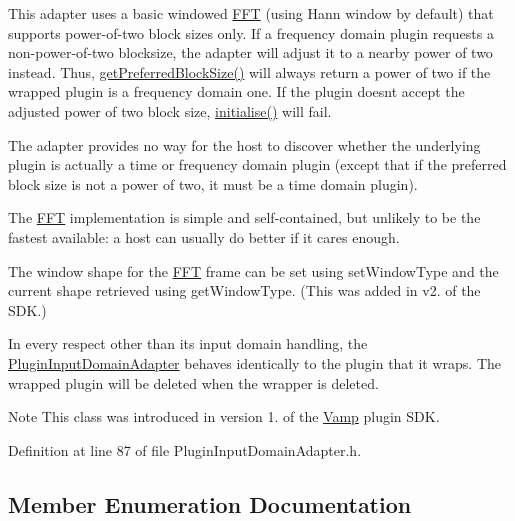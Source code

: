 This adapter uses a basic windowed \hyperlink{class_vamp_1_1_f_f_t}{F\+FT} (using Hann window by default) that supports power-\/of-\/two block sizes only. If a frequency domain plugin requests a non-\/power-\/of-\/two blocksize, the adapter will adjust it to a nearby power of two instead. Thus, \hyperlink{class_vamp_1_1_host_ext_1_1_plugin_input_domain_adapter_a4cf40d09d02022b1962ff17bb0324ea5}{get\+Preferred\+Block\+Size()} will always return a power of two if the wrapped plugin is a frequency domain one. If the plugin doesn\textquotesingle{}t accept the adjusted power of two block size, \hyperlink{class_vamp_1_1_host_ext_1_1_plugin_input_domain_adapter_a72d201eca10ec73bf16e07984f58f94c}{initialise()} will fail.

The adapter provides no way for the host to discover whether the underlying plugin is actually a time or frequency domain plugin (except that if the preferred block size is not a power of two, it must be a time domain plugin).

The \hyperlink{class_vamp_1_1_f_f_t}{F\+FT} implementation is simple and self-\/contained, but unlikely to be the fastest available\+: a host can usually do better if it cares enough.

The window shape for the \hyperlink{class_vamp_1_1_f_f_t}{F\+FT} frame can be set using set\+Window\+Type and the current shape retrieved using get\+Window\+Type. (This was added in v2. of the S\+DK.)

In every respect other than its input domain handling, the \hyperlink{class_vamp_1_1_host_ext_1_1_plugin_input_domain_adapter}{Plugin\+Input\+Domain\+Adapter} behaves identically to the plugin that it wraps. The wrapped plugin will be deleted when the wrapper is deleted.

\begin{DoxyNote}{Note}
This class was introduced in version 1. of the \hyperlink{namespace_vamp}{Vamp} plugin S\+DK. 
\end{DoxyNote}


Definition at line 87 of file Plugin\+Input\+Domain\+Adapter.\+h.



\subsection{Member Enumeration Documentation}
